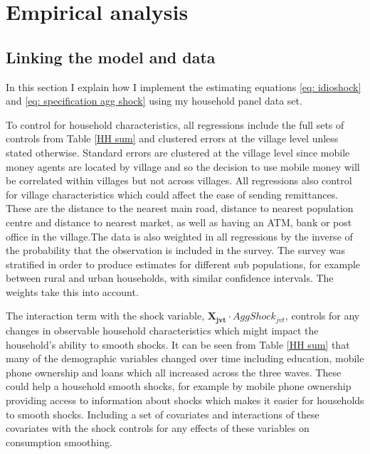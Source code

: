 \newpage
\section{Empirical analysis}
\subsection{Linking the model and data}
In this section I explain how I implement the estimating equations \eqref{eq: idioshock} and \eqref{eq: specification agg shock} using my household panel data set. 

To control for household characteristics, all regressions include the full sets of controls from Table \ref{HH sum} and clustered errors at the village level unless stated otherwise. Standard errors are clustered at the village level since mobile money agents are located by village and so the decision to use mobile money will be correlated within villages but not across villages. All regressions also control for village characteristics which could affect the ease of sending remittances. These are the distance to the nearest main road, distance to nearest population centre and distance to nearest market, as well as having an ATM, bank or post office in the village.The data is also weighted in all regressions by the inverse of the probability that the observation is included in the survey. The survey was stratified in order to produce estimates for different sub populations, for example between rural and urban households, with similar confidence intervals. The weights take this into account.

The interaction term with the shock variable, $\bm{X_{jvt}} \cdot AggShock_{jvt}$, controls for any changes in observable household characteristics which might impact the household's ability to smooth shocks. It can be seen from Table \ref{HH sum} that many of the demographic variables changed over time including education, mobile phone ownership and loans which all increased across the three waves. These could help a household smooth shocks, for example by mobile phone ownership providing access to information about shocks which makes it easier for households to smooth shocks. Including a set of covariates and interactions of these covariates with the shock controls for any effects of these variables on consumption smoothing.  

